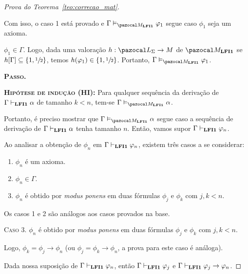\begin{proof}[Prova do Teorema~\ref{teo:correcao_mat}]
\begin{provaporcasos}
\begin{provaporsubcasos}
\begin{center}
                    \end{center}
                    
                \end{provaporsubcasos}

                Com isso, o caso 1 está provado e $\Gamma \conmat \phi_{1}$ segue caso $\phi_{1}$ seja um axioma.

                \casodeprova{} $\phi_{1} \in \Gamma$. Logo, dada uma valoração $h : \ling{} \to M$ de $\mat{}$ se $h[\Gamma] \subseteq \{1, \sfrac{1}{2}{}\}$, temos $h(\varphi_{1}) \in \{1, \sfrac{1}{2}{}\}$. Portanto, $\Gamma \conmat \phi_{1}$.

            \end{provaporcasos}

            \noindent \textbf{\textsc{Passo.}}
            
            \noindent \textbf{\textsc{Hipótese de indução (HI):}} Para qualquer sequência da derivação de $\Gamma \vdash_{{\normalfont\textbf{LFI1}}{}} \alpha$ de tamanho $k < n$, tem-se $\Gamma \conmat \alpha$. 
            
            Portanto, é preciso mostrar que $\Gamma \conmat \alpha$ segue caso a sequência de derivação de $\Gamma \vdash_{{\normalfont\textbf{LFI1}}{}} \alpha$ tenha tamanho $n$. Então, vamos supor $\Gamma \vdash_{{\normalfont\textbf{LFI1}}{}} \varphi_{n}$.
            
            Ao analisar a obtenção de $\phi_{n}$ em $\Gamma \vdash_{{\normalfont\textbf{LFI1}}{}} \varphi_{n}$, existem três casos a se considerar:
            
            \begin{enumerate}
                \item $\phi_{n}$ é um axioma.
                \item $\phi_{n} \in \Gamma$.
                \item $\phi_{n}$ é obtido por \textit{modus ponens} em duas fórmulas $\phi_{j}$ e $\phi_{k}$ com $j, k < n$. 
            \end{enumerate}
            
            Os casos 1 e 2 são análogos aos casos provados na base.
            
            \noindent \textsc{Caso 3.} $\phi_{n}$ é obtido por \textit{modus ponens} em duas fórmulas $\phi_{j}$ e $\phi_{k}$ com $j, k < n$. 
            
            Logo, $\phi_{k} = \phi_{j} \to \phi_{n}$ (ou $\phi_{j} = \phi_{k} \to \phi_{n}$, a prova para este caso é análoga). 
            
            Dada nossa suposição de $\Gamma \vdash_{{\normalfont\textbf{LFI1}}{}} \varphi_{n}$, então $\Gamma \vdash_{{\normalfont\textbf{LFI1}}{}} \varphi_{j}$ e $\Gamma \vdash_{{\normalfont\textbf{LFI1}}{}} \varphi_{j} \to \varphi_{n}$. 
            

\end{proof}
